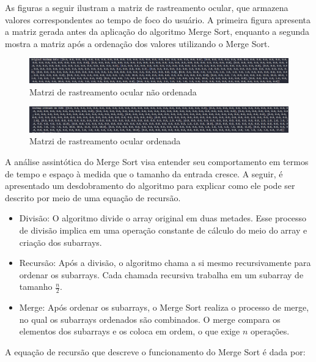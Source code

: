 As figuras a seguir ilustram a matriz de rastreamento ocular, que armazena valores correspondentes ao tempo de foco do usuário. A primeira figura apresenta a matriz gerada antes da aplicação do algoritmo Merge Sort, enquanto a segunda mostra a matriz após a ordenação dos valores utilizando o Merge Sort.

\begin{figure}[H]
    \centering
    \caption{Matrzi de rastreamento ocular não ordenada}%
    \label{fig:pg-mergesort}
    \includegraphics[width=0.72\linewidth]{Illustrations/desordenado.png}
\end{figure}

\begin{figure}[H]
    \centering
    \caption{Matrzi de rastreamento ocular ordenada}%
    \label{fig:pg-mergesort2}
    \includegraphics[width=0.72\linewidth]{Illustrations/ordenado.png}
\end{figure}


A análise assintótica do Merge Sort visa entender seu comportamento em termos de tempo e espaço à medida que o tamanho da entrada cresce. A seguir, é apresentado um desdobramento do algoritmo para explicar como ele pode ser descrito por meio de uma equação de recursão.

\begin{itemize}
    \item Divisão: O algoritmo divide o array original em duas metades. Esse processo de divisão implica em uma operação constante de cálculo do meio do array e criação dos subarrays.
    \item Recursão: Após a divisão, o algoritmo chama a si mesmo recursivamente para ordenar os subarrays. Cada chamada recursiva trabalha em um subarray de tamanho \( \frac{n}{2} \).
    \item Merge: Após ordenar os subarrays, o Merge Sort realiza o processo de merge, no qual os subarrays ordenados são combinados. O merge compara os elementos dos subarrays e os coloca em ordem, o que exige \( n \) operações.
\end{itemize}

A equação de recursão que descreve o funcionamento do Merge Sort é dada por:

